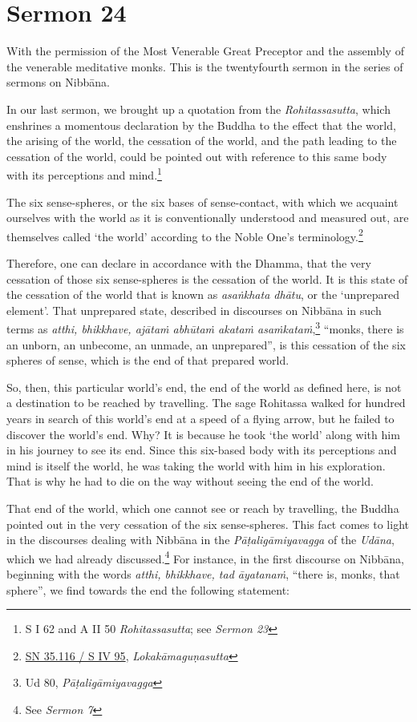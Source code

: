 \chapter{Sermon 24}

\NibbanaOpeningQuote

With the permission of the Most Venerable Great Preceptor and the assembly of the venerable meditative monks. This is the twentyfourth sermon in the series of sermons on Nibbāna.

In our last sermon, we brought up a quotation from the \emph{Rohitassasutta}, which enshrines a momentous declaration by the Buddha to the effect that the world, the arising of the world, the cessation of the world, and the path leading to the cessation of the world, could be pointed out with reference to this same body with its perceptions and mind.\footnote{S I 62 and A II 50 \emph{Rohitassasutta}; see \emph{Sermon 23}}

The six sense-spheres, or the six bases of sense-contact, with which we acquaint ourselves with the world as it is conventionally understood and measured out, are themselves called `the world' according to the Noble One's terminology.\footnote{\href{https://suttacentral.net/sn35.116/pli/ms}{SN 35.116 / S IV 95}, \emph{Lokakāmaguṇasutta}}

Therefore, one can declare in accordance with the Dhamma, that the very cessation of those six sense-spheres is the cessation of the world. It is this state of the cessation of the world that is known as \emph{asaṅkhata dhātu}, or the `unprepared element'. That unprepared state, described in discourses on Nibbāna in such terms as \emph{atthi, bhikkhave, ajātaṁ abhūtaṁ akataṁ asaṁkataṁ},\footnote{Ud 80, \emph{Pāṭaligāmiyavagga}} ``monks, there is an unborn, an unbecome, an unmade, an unprepared'', is this cessation of the six spheres of sense, which is the end of that prepared world.

So, then, this particular world's end, the end of the world as defined here, is not a destination to be reached by travelling. The sage Rohitassa walked for hundred years in search of this world's end at a speed of a flying arrow, but he failed to discover the world's end. Why? It is because he took `the world' along with him in his journey to see its end. Since this six-based body with its perceptions and mind is itself the world, he was taking the world with him in his exploration. That is why he had to die on the way without seeing the end of the world.

That end of the world, which one cannot see or reach by travelling, the Buddha pointed out in the very cessation of the six sense-spheres. This fact comes to light in the discourses dealing with Nibbāna in the \emph{Pāṭaligāmiyavagga} of the \emph{Udāna}, which we had already discussed.\footnote{See \emph{Sermon 7}} For instance, in the first discourse on Nibbāna, beginning with the words \emph{atthi, bhikkhave, tad āyatanaṁ}, ``there is, monks, that sphere'', we find towards the end the following statement:

